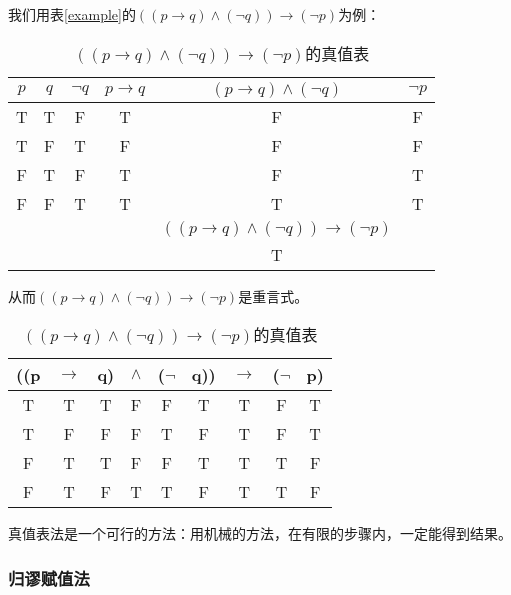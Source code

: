 \documentclass[12pt,onecolumn,a4paper]{book}
\numberwithin{table}{subsection}
\numberwithin{equation}{subsection}
\begin{document}
我们用表\ref{example}的$((p\rightarrow q)\land(\lnot q))\rightarrow(\lnot p)$为例：
\begin{table}[h]
    \centering
    \begin{tabular}{ccc|ccc}
        \hline
        $p$ & $q$ & $\lnot q$ & $p\rightarrow q$ & $(p\rightarrow q)\land(\lnot q)$ & $\lnot p$ \\ \hline
        T & T & F & T & F & F \\
        T & F & T & F & F & F \\
        F & T & F & T & F & T \\
        F & F & T & T & T & T \\ \hline
        & & & & $((p\rightarrow q)\land(\lnot q))\rightarrow(\lnot p)$ & \\ \cline{5-5}
        & & & & T & \\
        \hline
    \end{tabular}
    \caption{$((p\rightarrow q)\land(\lnot q))\rightarrow(\lnot p)$的真值表}
\end{table}

从而$((p\rightarrow q)\land(\lnot q))\rightarrow(\lnot p)$是重言式。

\begin{table}[h]
    \centering
    \begin{tabular}{ccccccccc}
    ((p & $\rightarrow$ & q) & $\land$ & ($\lnot$ & q))                    & $\rightarrow$          & ($\lnot$ & p) \\ \hline
    T   & T              & T  & F       & F        & \multicolumn{1}{c|}{T} & \multicolumn{1}{c|}{T} & F        & T  \\
    T   & F              & F  & F       & T        & \multicolumn{1}{c|}{F} & \multicolumn{1}{c|}{T} & F        & T  \\
    F   & T              & T  & F       & F        & \multicolumn{1}{c|}{T} & \multicolumn{1}{c|}{T} & T        & F  \\
    F   & T              & F  & T       & T        & \multicolumn{1}{c|}{F} & \multicolumn{1}{c|}{T} & T        & F 
    \end{tabular}
    \caption{$((p\rightarrow q)\land(\lnot q))\rightarrow(\lnot p)$的真值表}
\end{table}

真值表法是一个可行的方法：用机械的方法，在有限的步骤内，一定能得到结果。

\subsubsection{归谬赋值法}
\end{document}
